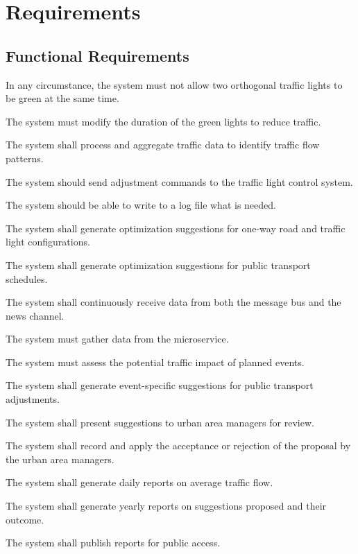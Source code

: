 \documentclass[12pt, a4paper, twoside, openright]{report}
\begin{document}
\section{Requirements}
\subsection{Functional Requirements}

\begin{functional_requirements}
\item
  In any circumstance, the system must not allow two orthogonal traffic
  lights to be green at the same time.
\item
  The system must modify the duration of the green lights to reduce
  traffic.
\item
  The system shall process and aggregate traffic data to identify
  traffic flow patterns.
\item
  The system should send adjustment commands to the traffic light
  control system.
\item
  The system should be able to write to a log file what is needed.
\item
  The system shall generate optimization suggestions for one-way road
  and traffic light configurations.
\item
  The system shall generate optimization suggestions for public
  transport schedules.
\item
  The system shall continuously receive data from both the message bus
  and the news channel.
\item
  The system must gather data from the microservice.
\item
  The system must assess the potential traffic impact of planned events.
\item
  The system shall generate event-specific suggestions for public
  transport adjustments.
\item
  The system shall present suggestions to urban area managers for
  review.
\item
  The system shall record and apply the acceptance or rejection of the
  proposal by the urban area managers.
\item
  The system shall generate daily reports on average traffic flow.
\item
  The system shall generate yearly reports on suggestions proposed and
  their outcome.
\item
  The system shall publish reports for public access.
\end{functional_requirements}
\end{document}
